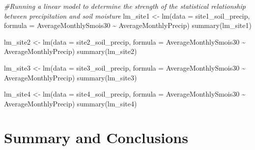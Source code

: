 \documentclass[
  12pt,
]{article}
\newenvironment{Shaded}{\begin{snugshade}}{\end{snugshade}}
\newcommand{\AttributeTok}[1]{\textcolor[rgb]{0.77,0.63,0.00}{#1}}
\newcommand{\CommentTok}[1]{\textcolor[rgb]{0.56,0.35,0.01}{\textit{#1}}}
\newcommand{\FunctionTok}[1]{\textcolor[rgb]{0.00,0.00,0.00}{#1}}
\newcommand{\NormalTok}[1]{#1}
\newcommand{\OtherTok}[1]{\textcolor[rgb]{0.56,0.35,0.01}{#1}}
\newcommand{\SpecialCharTok}[1]{\textcolor[rgb]{0.00,0.00,0.00}{#1}}
\begin{document}
\begin{Shaded}
\begin{Highlighting}[]
\CommentTok{\#Running a linear model to determine the strength of the statistical relationship between precipitation and soil moisture}
\NormalTok{lm\_site1 }\OtherTok{\textless{}{-}} \FunctionTok{lm}\NormalTok{(}\AttributeTok{data =}\NormalTok{ site1\_soil\_precip, }\AttributeTok{formula =}\NormalTok{ AverageMonthlySmois30 }\SpecialCharTok{\textasciitilde{}}\NormalTok{ AverageMonthlyPrecip)}
\FunctionTok{summary}\NormalTok{(lm\_site1)}

\NormalTok{lm\_site2 }\OtherTok{\textless{}{-}} \FunctionTok{lm}\NormalTok{(}\AttributeTok{data =}\NormalTok{ site2\_soil\_precip, }\AttributeTok{formula =}\NormalTok{ AverageMonthlySmois30 }\SpecialCharTok{\textasciitilde{}}\NormalTok{ AverageMonthlyPrecip)}
\FunctionTok{summary}\NormalTok{(lm\_site2)}

\NormalTok{lm\_site3 }\OtherTok{\textless{}{-}} \FunctionTok{lm}\NormalTok{(}\AttributeTok{data =}\NormalTok{ site3\_soil\_precip, }\AttributeTok{formula =}\NormalTok{ AverageMonthlySmois30 }\SpecialCharTok{\textasciitilde{}}\NormalTok{ AverageMonthlyPrecip)}
\FunctionTok{summary}\NormalTok{(lm\_site3)}

\NormalTok{lm\_site4 }\OtherTok{\textless{}{-}} \FunctionTok{lm}\NormalTok{(}\AttributeTok{data =}\NormalTok{ site4\_soil\_precip, }\AttributeTok{formula =}\NormalTok{ AverageMonthlySmois30 }\SpecialCharTok{\textasciitilde{}}\NormalTok{ AverageMonthlyPrecip)}
\FunctionTok{summary}\NormalTok{(lm\_site4)}
\end{Highlighting}
\end{Shaded}

\newpage

\hypertarget{summary-and-conclusions}{%
\section{Summary and Conclusions}\label{summary-and-conclusions}}
\end{document}
